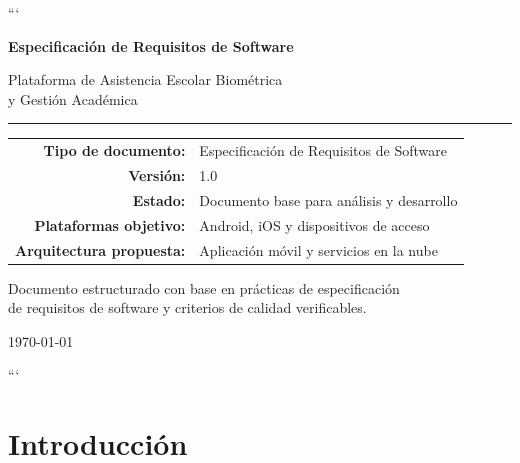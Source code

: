 \documentclass[12pt,a4paper]{article}
\begin{document}
\begin{titlepage}
\centering

```
\vspace*{1.5cm}

{\Huge\bfseries\color{primary}
Especificación de Requisitos de Software\par}

\vspace{0.8cm}

{\LARGE
Plataforma de Asistencia Escolar Biométrica\\
y Gestión Académica\par}

\vspace{1.5cm}

\rule{\textwidth}{1.2pt}

\vspace{1cm}

\begin{tabular}{rl}
    \textbf{Tipo de documento:} & Especificación de Requisitos de Software\\
    \textbf{Versión:} & 1.0\\
    \textbf{Estado:} & Documento base para análisis y desarrollo\\
    \textbf{Plataformas objetivo:} & Android, iOS y dispositivos de acceso\\
    \textbf{Arquitectura propuesta:} & Aplicación móvil y servicios en la nube\\
\end{tabular}

\vfill

{\large
Documento estructurado con base en prácticas de especificación\\
de requisitos de software y criterios de calidad verificables.\par}

\vspace{1cm}

{\large \today\par}
```

\end{titlepage}

\tableofcontents
\newpage

\section{Introducción}
\end{document}
